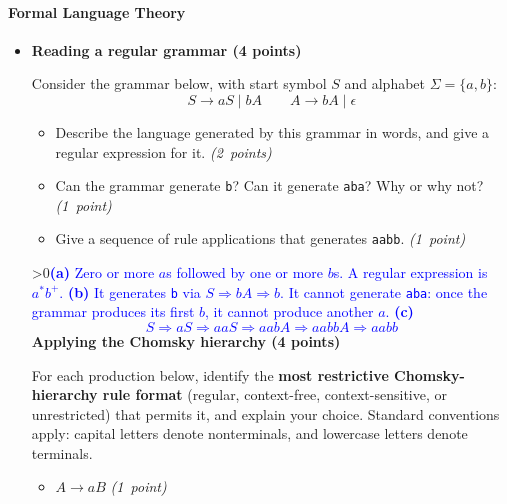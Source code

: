 \documentclass[12pt]{article}
\newcounter{showsolution}
\newcommand{\solution}[2]{\ifnum\value{showsolution}>0{\textcolor{blue}{#1}}\else{#2}\fi}
\begin{document}
\paragraph{Formal Language Theory}
\begin{itemize}

\item[1.] \textbf{Reading a regular grammar (4 points)}

Consider the grammar below, with start symbol $S$ and alphabet $\Sigma=\{a,b\}$:
%
\[
  S \rightarrow aS \mid bA
  \qquad
  A \rightarrow bA \mid \epsilon
\]

\begin{itemize}
\item[a.] Describe the language generated by this grammar in words, and give a regular expression for it. \hfill{\em (2~points)}
\par\vspace{0.65in}

\item[b.] Can the grammar generate \texttt{b}? Can it generate \texttt{aba}? 
Why or why not? \hfill{\em (1~point)}
\par\vspace{0.5in}

\item[c.] Give a sequence of rule applications that generates \texttt{aabb}. \hfill{\em (1~point)}
\par\vspace{0.6in}
\end{itemize}

\solution{\textbf{(a)} Zero or more $a$s followed by one or more $b$s.
A regular expression is $a^*b^+$.
\textbf{(b)} It generates \texttt{b} via $S \Rightarrow bA \Rightarrow b$.
It cannot generate \texttt{aba}: once the grammar produces its first $b$, it cannot produce another $a$.
\textbf{(c)}
%
\[
  S \Rightarrow aS \Rightarrow aaS \Rightarrow aabA
    \Rightarrow aabbA \Rightarrow aabb
\]
}

\item[2.] \textbf{Applying the Chomsky hierarchy (4 points)}

For each production below, identify the \textbf{most restrictive Chomsky-hierarchy rule format} (regular, context-free, context-sensitive, or unrestricted) that permits it, and explain your choice.
Standard conventions apply: capital letters denote nonterminals, and lowercase letters denote terminals. 

\begin{itemize}
\item[a.] $A \rightarrow aB$ \hfill{\em (1~point)}
\par\vspace{0.5in}


\end{itemize}
\end{itemize}
\end{document}
